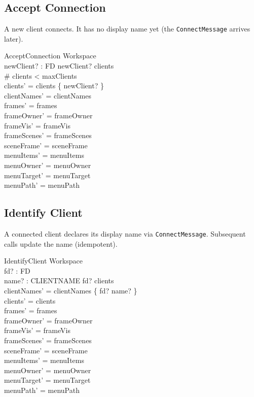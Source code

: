 \documentclass[a4paper,10pt,fleqn]{article}
\begin{document}
\subsection{Accept Connection}

A new client connects.  It has no display name yet (the
\texttt{ConnectMessage} arrives later).

\begin{schema}{AcceptConnection}
  \Delta Workspace \\
  newClient? : FD
  \where
  newClient? \notin clients \\
  \# clients < maxClients \\
  clients' = clients \cup \{ newClient? \} \\
  clientNames' = clientNames \\
  frames' = frames \\
  frameOwner' = frameOwner \\
  frameVis' = frameVis \\
  frameScenes' = frameScenes \\
  sceneFrame' = sceneFrame \\
  menuItems' = menuItems \\
  menuOwner' = menuOwner \\
  menuTarget' = menuTarget \\
  menuPath' = menuPath
\end{schema}

\subsection{Identify Client}

A connected client declares its display name via
\texttt{ConnectMessage}.  Subsequent calls update the name (idempotent).

\begin{schema}{IdentifyClient}
  \Delta Workspace \\
  fd? : FD \\
  name? : CLIENTNAME
  \where
  fd? \in clients \\
  clientNames' = clientNames \oplus \{ fd? \mapsto name? \} \\
  clients' = clients \\
  frames' = frames \\
  frameOwner' = frameOwner \\
  frameVis' = frameVis \\
  frameScenes' = frameScenes \\
  sceneFrame' = sceneFrame \\
  menuItems' = menuItems \\
  menuOwner' = menuOwner \\
  menuTarget' = menuTarget \\
  menuPath' = menuPath
\end{schema}
\end{document}

